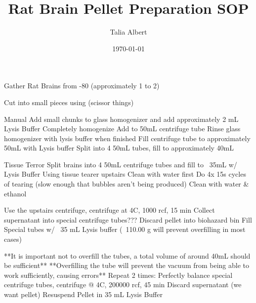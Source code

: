 \documentclass[12pt, letterpaper]{article}
\title{Rat Brain Pellet Preparation SOP}
\author{
    Talia Albert
}
\date{\today}
\begin{document}
\maketitle
\tableofcontents

Gather Rat Brains from -80 (approximately 1 to 2)

Cut into small pieces using (scissor things)

Manual
    Add small chunks to glass homogenizer and add approximately 2 mL Lysis Buffer
    Completely homogenize
    Add to 50mL centrifuge tube
    Rinse glass homogenizer with lysis buffer when finished
    Fill centrifuge tube to approximately 50mL with Lysis buffer
    Split into 4 50mL tubes, fill to approximately 40mL
    

Tissue Terror
    Split brains into 4 50mL centrifuge tubes and fill to ~35mL w/ Lysis Buffer
    Using tissue tearer upstairs
        Clean with water first
        Do 4x 15s cycles of tearing (slow enough that bubbles aren't being produced)
        Clean with water & ethanol


Use the upstairs centrifuge, centrifuge at 4C, 1000 rcf, 15 min
    Collect supernatant into special centrifuge tubes??? 
    Discard pellet into biohazard bin
    Fill Special tubes w/ ~35 mL Lysis buffer (~110.00 g will prevent overfilling in most cases)

    **It is important not to overfill the tubes, a total volume of around 40mL should be sufficient**
    **Overfilling the tube will prevent the vacuum from being able to work sufficiently, causing errors**
Repeat 2 times:
    Perfectly balance special centrifuge tubes, centrifuge @ 4C, 200000 rcf, 45 min
        Discard supernatant (we want pellet)
        Resuspend Pellet in 35 mL Lysis Buffer
\end{document}
